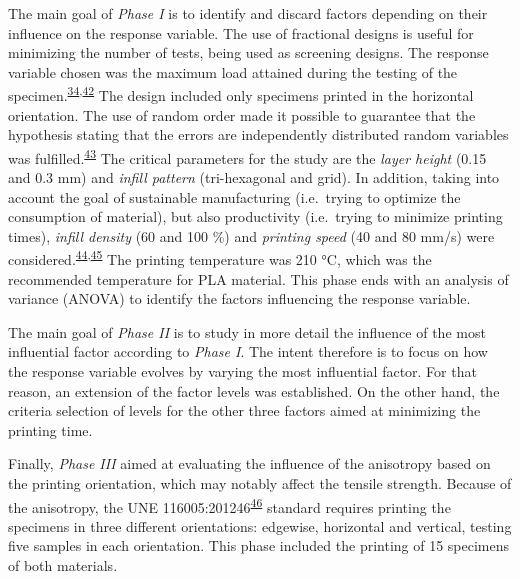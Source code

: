 \documentclass[
  12pt]{article}
\begin{document}
The main goal of \emph{Phase I} is to identify and discard factors depending on their influence on the response variable.
The use of fractional designs is useful for minimizing the number of tests, being used as screening designs.
The response variable chosen was the maximum load attained during the testing of the specimen.\textsuperscript{\protect\hyperlink{ref-Kumar2018b}{34},\protect\hyperlink{ref-Chacon2017}{42}}
The design included only specimens printed in the horizontal orientation.
The use of random order made it possible to guarantee that the hypothesis stating that the errors are independently distributed random variables was fulfilled.\textsuperscript{\protect\hyperlink{ref-Montgomery2001}{43}}
The critical parameters for the study are the \emph{layer height} (0.15 and 0.3 mm) and \emph{infill pattern} (tri-hexagonal and grid).
In addition, taking into account the goal of sustainable manufacturing (i.e.~trying to optimize the consumption of material), but also productivity (i.e.~trying to minimize printing times), \emph{infill density} (60 and 100 \%) and \emph{printing speed} (40 and 80 mm/s) were considered.\textsuperscript{\protect\hyperlink{ref-Singh2019}{44},\protect\hyperlink{ref-Tanveer2019}{45}}
The printing temperature was 210 °C, which was the recommended temperature for PLA material.
This phase ends with an analysis of variance (ANOVA) to identify the factors influencing the response variable.

The main goal of \emph{Phase II} is to study in more detail the influence of the most influential factor according to \emph{Phase I}.
The intent therefore is to focus on how the response variable evolves by varying the most influential factor.
For that reason, an extension of the factor levels was established.
On the other hand, the criteria selection of levels for the other three factors aimed at minimizing the printing time.

Finally, \emph{Phase III} aimed at evaluating the influence of the anisotropy based on the printing orientation, which may notably affect the tensile strength.
Because of the anisotropy, the UNE 116005:201246\textsuperscript{\protect\hyperlink{ref-UNE}{46}} standard requires printing the specimens in three different orientations: edgewise, horizontal and vertical, testing five samples in each orientation.
This phase included the printing of 15 specimens of both materials.
\end{document}
